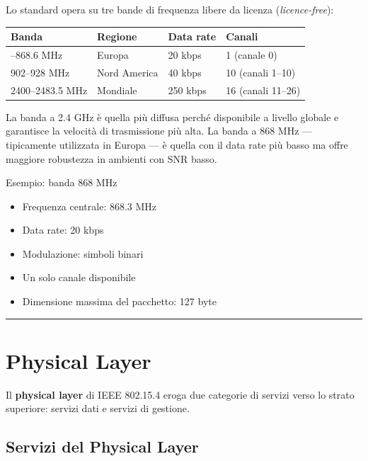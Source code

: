 \documentclass[
  italian,
  openany]{book}
\newcounter{none} %
\providecommand{\tightlist}{%
  \setlength{\itemsep}{0pt}\setlength{\parskip}{0pt}}
\begin{document}
Lo standard opera su tre bande di frequenza libere da licenza
(\emph{licence-free}):

{\def\LTcaptype{none} %
\begin{longtable}[]{@{}llll@{}}
\toprule\noalign{}
Banda & Regione & Data rate & Canali \\
\midrule\noalign{}
\endhead
\bottomrule\noalign{}
\endlastfoot
868--868.6 MHz & Europa & 20 kbps & 1 (canale 0) \\
902--928 MHz & Nord America & 40 kbps & 10 (canali 1--10) \\
2400--2483.5 MHz & Mondiale & 250 kbps & 16 (canali 11--26) \\
\end{longtable}
}

La banda a 2.4 GHz è quella più diffusa perché disponibile a livello
globale e garantisce la velocità di trasmissione più alta. La banda a
868 MHz --- tipicamente utilizzata in Europa --- è quella con il data
rate più basso ma offre maggiore robustezza in ambienti con SNR basso.

\begin{callouttip}{Esempio: banda 868 MHz}

\begin{itemize}
\tightlist
\item
  Frequenza centrale: 868.3 MHz
\item
  Data rate: 20 kbps
\item
  Modulazione: simboli binari
\item
  Un solo canale disponibile
\item
  Dimensione massima del pacchetto: 127 byte
\end{itemize}

\end{callouttip}

\begin{center}\rule{0.5\linewidth}{0.5pt}\end{center}

\section{Physical Layer}\label{physical-layer}

Il \textbf{physical layer} di IEEE 802.15.4 eroga due categorie di
servizi verso lo strato superiore: servizi dati e servizi di gestione.

\subsection{Servizi del Physical
Layer}\label{servizi-del-physical-layer}
\end{document}
